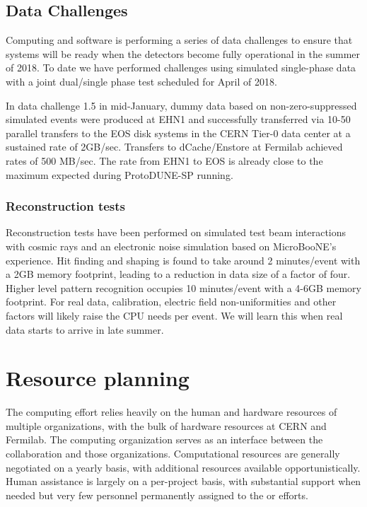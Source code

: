 \begin{enumerate}
\subsection{Data Challenges}

Computing and software is performing a series of data challenges to ensure that systems will be ready when the detectors become fully operational in the summer of 2018.  To date we have performed challenges using simulated single-phase data with a joint dual/single phase test scheduled for April of 2018.

In data challenge 1.5 in mid-January, dummy data based on non-zero-suppressed simulated events were produced at EHN1 and successfully transferred via 10-50 parallel transfers to the EOS disk systems in the CERN Tier-0 data center at a sustained rate of 2GB/sec.    Transfers to dCache/Enstore at Fermilab achieved rates of 500 MB/sec.  
The rate from EHN1 to EOS is already close to the maximum expected during ProtoDUNE-SP running.

\subsubsection{Reconstruction tests}
Reconstruction tests have been performed on simulated test beam interactions with cosmic rays and an electronic noise simulation based on MicroBooNE's experience.  Hit finding and shaping is found to take around 2 minutes/event with a 2GB memory footprint, leading to a reduction in data size of a factor of four.  Higher level pattern recognition occupies 10 minutes/event with a 4-6GB memory footprint. For real data, calibration, electric field non-uniformities and other factors will likely raise the CPU needs per event. We will learn this when real data starts to arrive in late summer. 


\section{Resource planning}



The   computing effort  relies heavily on the human and hardware resources of  multiple organizations,  with the bulk of hardware resources at CERN and Fermilab.  The    computing organization serves as an interface between the collaboration and those organizations.  Computational resources are generally negotiated on a yearly basis, with additional resources available opportunistically. Human assistance is largely on a per-project  basis, with substantial support when needed but very few personnel permanently assigned to the   or  efforts.


\end{enumerate}
